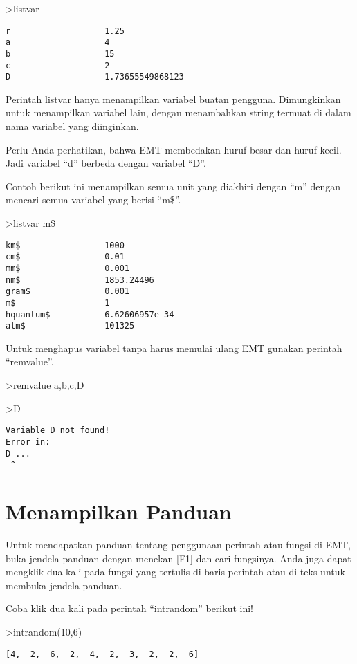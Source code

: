 \documentclass[
]{book}
\begin{document}
\textgreater listvar

\begin{verbatim}
r                   1.25
a                   4
b                   15
c                   2
D                   1.73655549868123
\end{verbatim}

Perintah listvar hanya menampilkan variabel buatan pengguna. Dimungkinkan untuk menampilkan variabel lain, dengan menambahkan string termuat di dalam nama variabel yang diinginkan.

Perlu Anda perhatikan, bahwa EMT membedakan huruf besar dan huruf kecil. Jadi variabel ``d'' berbeda dengan variabel ``D''.

Contoh berikut ini menampilkan semua unit yang diakhiri dengan ``m'' dengan mencari semua variabel yang berisi ``m\$''.

\textgreater listvar m\$

\begin{verbatim}
km$                 1000
cm$                 0.01
mm$                 0.001
nm$                 1853.24496
gram$               0.001
m$                  1
hquantum$           6.62606957e-34
atm$                101325
\end{verbatim}

Untuk menghapus variabel tanpa harus memulai ulang EMT gunakan perintah ``remvalue''.

\textgreater remvalue a,b,c,D

\textgreater D

\begin{verbatim}
Variable D not found!
Error in:
D ...
 ^
\end{verbatim}

\chapter{Menampilkan Panduan}\label{menampilkan-panduan}

Untuk mendapatkan panduan tentang penggunaan perintah atau fungsi di EMT, buka jendela panduan dengan menekan {[}F1{]} dan cari fungsinya. Anda juga dapat mengklik dua kali pada fungsi yang tertulis di baris perintah atau di teks untuk membuka jendela panduan.

Coba klik dua kali pada perintah ``intrandom'' berikut ini!

\textgreater intrandom(10,6)

\begin{verbatim}
[4,  2,  6,  2,  4,  2,  3,  2,  2,  6]
\end{verbatim}
\end{document}
